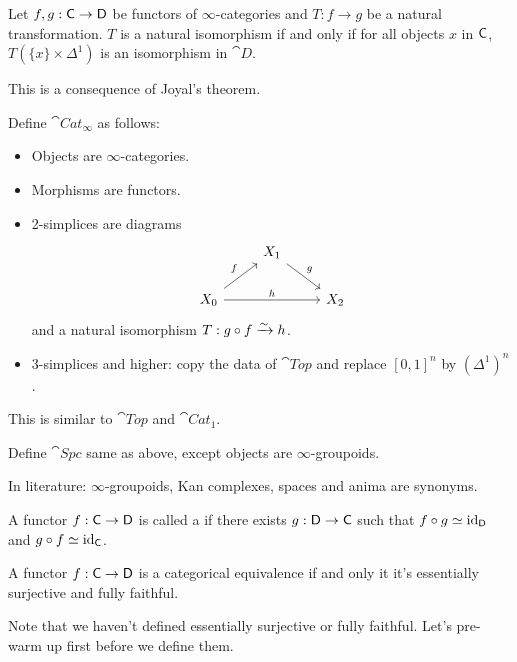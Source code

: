 \begin{theorem}
	Let $f,g:\C\to \cat{D}$ be functors of $\infty$-categories and $T:f\to g$ be a natural transformation. $T$ is a natural isomorphism if and only if for all objects $x$ in $\mathsf{C}$, $T(\{x\}\times \Delta^{1})$ is an isomorphism in $\cat{D}$.
\end{theorem}
This is a consequence of Joyal's theorem.
\begin{definition}
	Define $\cat{Cat}_\infty$ as follows:
	\begin{itemize}
		\item Objects are $\infty$-categories.
		\item Morphisms are functors.
		\item 2-simplices are diagrams
			\[
			\begin{tikzcd}
				& X_1 \ar[dr,"g"] \\
				X_0 \ar[ur,"f"] \ar[rr,"h"] & & X_2
			\end{tikzcd}
			\] 
			and a natural isomorphism $T:g\circ f\xrightarrow{\sim} h$.
		\item 3-simplices and higher: copy the data of $\cat{Top}$ and replace $[0,1]^{n}$ by $(\Delta^{1})^{n}$.
	\end{itemize}
\end{definition}
This is similar to $\cat{Top}$ and $\cat{Cat}_1$.
\begin{definition}
	Define $\cat{Spc}$ same as above, except objects are $\infty$-groupoids.
\end{definition}
In literature: $\infty$-groupoids, Kan complexes, spaces and anima are synonyms.
\begin{definition}
	A functor $f:\C\to \cat{D}$ is called a  if there exists $g:\cat{D}\to \C$ such that $f\circ g\simeq \operatorname{id}_{\mathsf{D}}$ and $g\circ f\simeq \operatorname{id}_{\mathsf{C}}$.
\end{definition}
\begin{theorem}
	A functor $f:\C\to \cat{D}$ is a categorical equivalence if and only it it's essentially surjective and fully faithful.
\end{theorem}
Note that we haven't defined essentially surjective or fully faithful. Let's pre-warm up first before we define them.

